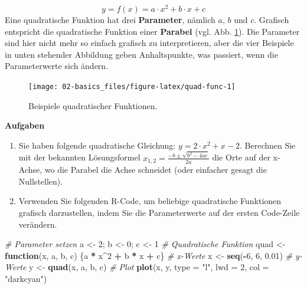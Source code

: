 \documentclass[
]{book}
\newenvironment{Shaded}{\begin{snugshade}}{\end{snugshade}}
\newcommand{\AttributeTok}[1]{\textcolor[rgb]{0.13,0.29,0.53}{#1}}
\newcommand{\CommentTok}[1]{\textcolor[rgb]{0.56,0.35,0.01}{\textit{#1}}}
\newcommand{\ControlFlowTok}[1]{\textcolor[rgb]{0.13,0.29,0.53}{\textbf{#1}}}
\newcommand{\DecValTok}[1]{\textcolor[rgb]{0.00,0.00,0.81}{#1}}
\newcommand{\FloatTok}[1]{\textcolor[rgb]{0.00,0.00,0.81}{#1}}
\newcommand{\FunctionTok}[1]{\textcolor[rgb]{0.13,0.29,0.53}{\textbf{#1}}}
\newcommand{\NormalTok}[1]{#1}
\newcommand{\OtherTok}[1]{\textcolor[rgb]{0.56,0.35,0.01}{#1}}
\newcommand{\SpecialCharTok}[1]{\textcolor[rgb]{0.81,0.36,0.00}{\textbf{#1}}}
\newcommand{\StringTok}[1]{\textcolor[rgb]{0.31,0.60,0.02}{#1}}
\providecommand{\tightlist}{%
  \setlength{\itemsep}{0pt}\setlength{\parskip}{0pt}}
\begin{document}
\[
y = f(x) = a \cdot x^2 + b \cdot x + c
\]
Eine quadratische Funktion hat drei \textbf{Parameter}, nämlich \(a\), \(b\) und \(c\). Grafisch entspricht die quadratische Funktion einer \textbf{Parabel} (vgl. Abb. \ref{fig:quad-func}). Die Parameter sind hier nicht mehr so einfach grafisch zu interpretieren, aber die vier Beispiele in unten stehender Abbildung geben Anhaltspunkte, was passiert, wenn die Parameterwerte sich ändern.

\begin{figure}

{\centering \texttt{[image: 02-basics\_files/figure-latex/quad-func-1]} 

}

\caption{Beispiele quadratischer Funktionen.}\label{fig:quad-func}
\end{figure}

\textbf{Aufgaben}

\begin{enumerate}
\def\labelenumi{\arabic{enumi}.}
\tightlist
\item
  Sie haben folgende quadratische Gleichung: \(y = 2 \cdot x^2 + x - 2\). Berechnen Sie mit der bekannten Lösungsformel \(x_{1,2}=\frac{-b \pm \sqrt{b^2 - 4ac}}{2a}\) die Orte auf der x-Achse, wo die Parabel die Achse schneidet (oder einfacher gesagt die Nullstellen).
\item
  Verwenden Sie folgenden R-Code, um beliebige quadratische Funktionen grafisch darzustellen, indem Sie die Parameterwerte auf der ersten Code-Zeile verändern.
\end{enumerate}

\begin{Shaded}
\begin{Highlighting}[]
\CommentTok{\# Parameter setzen}
\NormalTok{a }\OtherTok{\textless{}{-}} \DecValTok{2}\NormalTok{; b }\OtherTok{\textless{}{-}} \DecValTok{0}\NormalTok{; c }\OtherTok{\textless{}{-}} \DecValTok{1}
\CommentTok{\# Quadratische Funktion}
\NormalTok{quad }\OtherTok{\textless{}{-}} \ControlFlowTok{function}\NormalTok{(x, a, b, c) \{a }\SpecialCharTok{*}\NormalTok{ x}\SpecialCharTok{\^{}}\DecValTok{2} \SpecialCharTok{+}\NormalTok{ b }\SpecialCharTok{*}\NormalTok{ x }\SpecialCharTok{+}\NormalTok{ c\}}
\CommentTok{\# x{-}Werte}
\NormalTok{x }\OtherTok{\textless{}{-}} \FunctionTok{seq}\NormalTok{(}\SpecialCharTok{{-}}\DecValTok{6}\NormalTok{, }\DecValTok{6}\NormalTok{, }\FloatTok{0.01}\NormalTok{)}
\CommentTok{\# y{-}Werte}
\NormalTok{y }\OtherTok{\textless{}{-}} \FunctionTok{quad}\NormalTok{(x, a, b, c)}
\CommentTok{\# Plot}
\FunctionTok{plot}\NormalTok{(x, y, }\AttributeTok{type =} \StringTok{"l"}\NormalTok{, }\AttributeTok{lwd =} \DecValTok{2}\NormalTok{, }\AttributeTok{col =} \StringTok{"darkcyan"}\NormalTok{)}
\end{Highlighting}
\end{Shaded}
\end{document}
